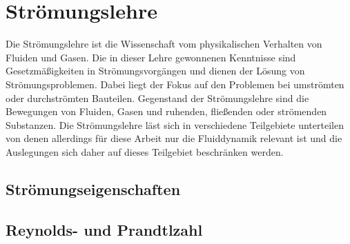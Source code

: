 \section{Str\"{o}mungslehre}
Die Str\"{o}mungslehre ist die Wissenschaft vom physikalischen Verhalten von Fluiden und Gasen. Die in dieser Lehre gewonnenen Kenntnisse sind Gesetzm\"{a}{\ss}igkeiten in Str\"{o}mungsvorg\"{a}ngen und dienen der L\"{o}sung von Str\"{o}mungsproblemen. Dabei liegt der Fokus auf den Problemen bei umstr\"{o}mten oder durchstr\"{o}mten Bauteilen. Gegenstand der Str\"{o}mungslehre sind die Bewegungen von Fluiden, Gasen und ruhenden, fließenden oder str\"{o}menden Substanzen. Die Str\"{o}mungslehre l\"{a}st sich in verschiedene Teilgebiete unterteilen von denen allerdings f\"{u}r diese Arbeit nur die Fluiddynamik relevant ist und die Auslegungen sich daher auf dieses Teilgebiet beschr\"{a}nken werden.

\subsection{Str\"{o}mungseigenschaften}

\subsection{Reynolds- und Prandtlzahl}
